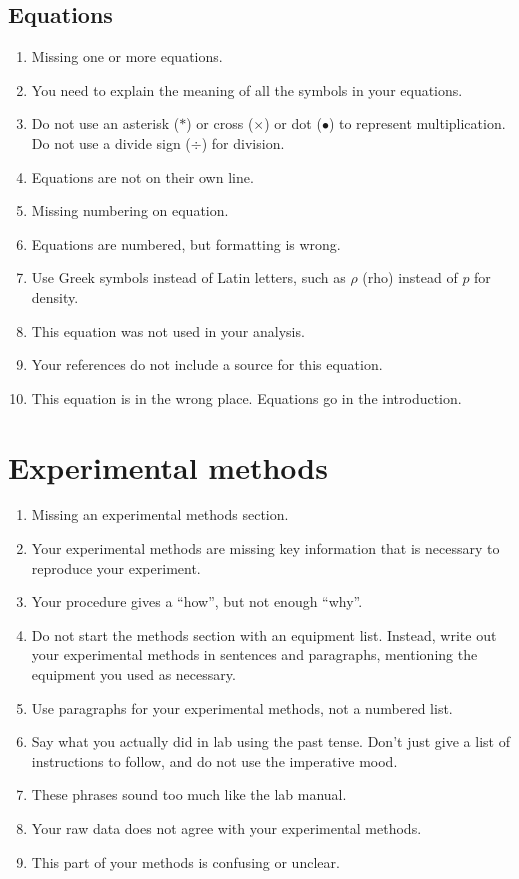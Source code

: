 \documentclass[12pt,letterpaper]{article}
\begin{document}
\begin{multicols}{2}
\subsection*{Equations}

\begin{enumerate}[start=30]
  \item Missing one or more equations.
  \item You need to explain the meaning of all the symbols in your equations.
  \item Do not use an asterisk ($*$) or cross ($\times$) or dot ($\bullet$)
    to represent multiplication.
    Do not use a divide sign ($\div$) for division.
  \item Equations are not on their own line.
  \item Missing numbering on equation.
  \item Equations are numbered, but formatting is wrong.
  \item Use Greek symbols instead of Latin letters,
    such as $\rho$ (rho) instead of $p$ for density.
  \item This equation was not used in your analysis.
  \item Your references do not include a source for this equation.
  \item This equation is in the wrong place. Equations go in the introduction.
\end{enumerate}

\section{Experimental methods}

\begin{enumerate}[start=40]
  \item Missing an experimental methods section.
  \item Your experimental methods are missing key information
    that is necessary to reproduce your experiment.
  \item Your procedure gives a ``how'', but not enough ``why''.
  \item Do not start the methods section with an equipment list.
    Instead, write out your experimental methods in sentences and paragraphs,
    mentioning the equipment you used as necessary.
  \item Use paragraphs for your experimental methods, not a numbered list.
  \item Say what you actually did in lab using the past tense.
    Don't just give a list of instructions to follow,
    and do not use the imperative mood.
  \item These phrases sound too much like the lab manual.
  \item Your raw data does not agree with your experimental methods.
  \item This part of your methods is confusing or unclear.
\end{enumerate}


\end{multicols}
\end{document}
